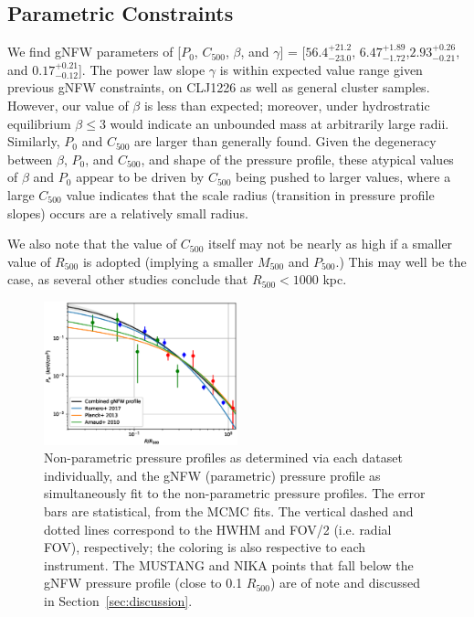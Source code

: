 \documentclass[twocolumn,traditabstract]{aa}
\begin{document}

\subsection{Parametric Constraints}

We find gNFW parameters of [$P_0$, $C_{500}$, $\beta$, and $\gamma$] =
[$56.4_{-23.0}^{+21.2}$, $6.47_{-1.72}^{+1.89}$,$2.93_{-0.21}^{+0.26}$, and $0.17_{-0.12}^{+0.21}$].
The power law slope $\gamma$ is within expected value range given previous gNFW constraints,
on CLJ1226 as well as general cluster samples. However, our value of $\beta$ is less than expected;
moreover, under hydrostratic equilibrium $\beta \le 3$ would indicate an unbounded mass at arbitrarily
large radii. Similarly, $P_0$ and $C_{500}$ are larger than generally found.
Given the degeneracy between $\beta$, $P_0$, and $C_{500}$, and shape of the pressure profile, these atypical
values of $\beta$ and  $P_0$ appear to be driven by $C_{500}$ being pushed to larger values, where a large $C_{500}$
value indicates that the scale radius (transition in pressure profile slopes) occurs are a relatively small radius.

We also note that the value of $C_{500}$ itself may not be nearly as high if a smaller value of $R_{500}$
is adopted (implying a smaller $M_{500}$ and $P_{500}$.) This may well be the case, as several other
studies conclude that $R_{500} < 1000$ kpc.

\begin{figure}[!h]
  \centering
  \includegraphics[width=0.5\textwidth]{NIKA_ml_deproj_figs/Real_Joint_gNFW_Real_11011111_2500S_500B_100W_gNFW_pressure_w_NP_pts_v2.eps}
  \caption{Non-parametric pressure profiles as determined via each dataset individually, and the gNFW (parametric)
    pressure profile as simultaneously fit to the non-parametric pressure profiles. The error bars are statistical,
    from the MCMC fits. The vertical dashed and dotted
    lines correspond to the HWHM and FOV/2 (i.e. radial FOV), respectively; the coloring is also respective to each
    instrument. The MUSTANG and NIKA points that fall below the gNFW pressure profile (close to 0.1 $R_{500}$) are of
    note and discussed in Section~\ref{sec:discussion}.}
  \label{fig:joint_pressure}
\end{figure}
\end{document}
